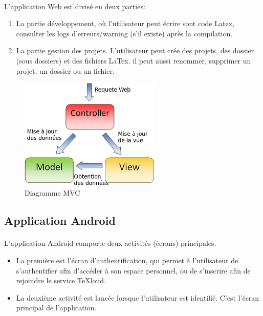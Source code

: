 \documentclass[a4paper,12pt]{article}
\begin{document}
\paragraph*{}
L'application Web est divisé en deux parties:
\begin{enumerate}
 \item La partie développement, où l'utilisateur peut écrire sont code Latex, consulter les logs d'erreurs/warning (s'il existe) après la compilation.
 \item La partie gestion des projets. L'utilisateur peut crée des projets, des dossier (sous dossiers) et des fichiers LaTex. il peut aussi renommer, supprimer un projet, un dossier ou un fichier.
\end{enumerate}

\clearpage

\begin{figure}[!ht]
\begin{center}
  \includegraphics[width=0.6\textwidth]{./images/MVC.png}
\end{center}
  \caption{Diagramme MVC}
  \label{MVC}
\end{figure}

\subsection{Application Android}
\paragraph*{}
L'application Android comporte deux activités (écrans) principales.
\begin{itemize}
 \item La première est l'écran d'authentification, qui permet à l'utilisateur de s'authentifier afin d'accéder à son espace personnel, ou de s'inscrire afin de rejoindre le service TeXloud.
 \item La deuxième activité est lancée lorsque l'utilisateur est identifié. C'est l'écran principal de l'application.
\end{itemize}
\end{document}

